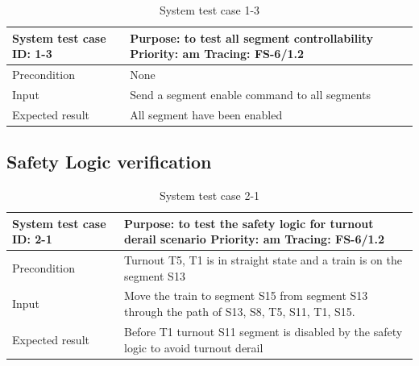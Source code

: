 \begin{table}[H]
	\caption{System test case 1-3}
	\label{table:TCase-FSS1-3}
	\begin{center}
		\renewcommand{\arraystretch}{1.8}
		\begin{tabu} 
			to 0.9 \textwidth
			{  X[0.3, l] X[l] }
			\toprule
			System test case ID: 1-3 & Purpose: to test all segment controllability \newline Priority: am \newline Tracing: FS-6/1.2 \\ \midrule
			Precondition             & None                                                                                          \\
			Input                    & Send a segment enable command to all segments                                                 \\
			Expected result          & All segment have been enabled                                                                 \\ \bottomrule
		\end{tabu}
	\end{center}
\end{table}

\subsection{Safety Logic verification}
\begin{table}[H]
	\caption{System test case 2-1}
	\label{table:TCase-FSS2-1}
	\begin{center}
		\renewcommand{\arraystretch}{1.8}
		\begin{tabu} 
			to 0.9 \textwidth
			{  X[0.3, l] X[l] }
			\toprule
			System test case ID: 2-1 & Purpose: to test the safety logic for turnout derail scenario   \newline Priority: am \newline Tracing: FS-6/1.2 \\ \midrule
			Precondition             & Turnout T5, T1 is in straight state and a train is on the segment S13                                            \\
			Input                    & Move the train to segment S15 from segment S13 through the path of S13, S8, T5, S11, T1, S15.                    \\
			Expected result          & Before T1 turnout S11 segment is disabled by the safety logic to avoid turnout derail               \\ \bottomrule
		\end{tabu}
	\end{center}
\end{table}

